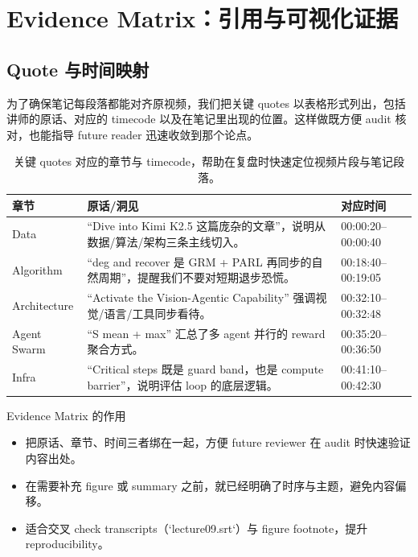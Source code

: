 \section{Evidence Matrix：引用与可视化证据}

\subsection{Quote 与时间映射}
\label{sec:evidence-quotes}
为了确保笔记每段落都能对齐原视频，我们把关键 quotes 以表格形式列出，包括讲师的原话、对应的 timecode 以及在笔记里出现的位置。这样做既方便 audit 核对，也能指导 future reader 迅速收敛到那个论点。

\begin{table}[H]
\footnotesize
\centering
\begin{tabular}{p{3cm}p{4cm}p{5cm}}
\toprule
章节 & 原话/洞见 & 对应时间 \\
\midrule
Data & ``Dive into Kimi K2.5 这篇庞杂的文章''，说明从数据/算法/架构三条主线切入。 & 00:00:20--00:00:40 \\
Algorithm & ``deg and recover 是 GRM + PARL 再同步的自然周期''，提醒我们不要对短期退步恐慌。 & 00:18:40--00:19:05 \\
Architecture & ``Activate the Vision-Agentic Capability'' 强调视觉/语言/工具同步看待。 & 00:32:10--00:32:48 \\
Agent Swarm & ``S mean + max'' 汇总了多 agent 并行的 reward 聚合方式。 & 00:35:20--00:36:50 \\
Infra & ``Critical steps 既是 guard band，也是 compute barrier''，说明评估 loop 的底层逻辑。 & 00:41:10--00:42:30 \\
\bottomrule
\end{tabular}
\caption{关键 quotes 对应的章节与 timecode，帮助在复盘时快速定位视频片段与笔记段落。}
\end{table}

\begin{knowledgebox}{Evidence Matrix 的作用}
\begin{itemize}
    \item 把原话、章节、时间三者绑在一起，方便 future reviewer 在 audit 时快速验证内容出处。
    \item 在需要补充 figure 或 summary 之前，就已经明确了时序与主题，避免内容偏移。
    \item 适合交叉 check transcripts（`lecture09.srt`）与 figure footnote，提升 reproducibility。
\end{itemize}
\end{knowledgebox}

